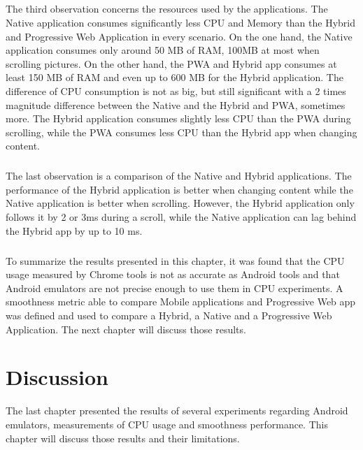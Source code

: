 \documentclass{kththesis}
\begin{document}
\paragraph{}
The third observation concerns the resources used by the applications. The Native application consumes significantly less CPU and Memory than the Hybrid and Progressive Web Application in every scenario. On the one hand, the Native application consumes only around 50 MB of RAM, 100MB at most when scrolling pictures. On the other hand, the PWA and Hybrid app consumes at least 150 MB of RAM and even up to 600 MB for the Hybrid application.  \newline
The difference of CPU consumption is not as big, but still significant with a 2 times magnitude difference between the Native and the Hybrid and PWA, sometimes more. The Hybrid application consumes slightly less CPU than the PWA during scrolling, while the PWA consumes less CPU than the Hybrid app when changing content. 

\paragraph{}
The last observation is a comparison of the Native and Hybrid applications. The performance of the Hybrid application is better when changing content while the Native application is better when scrolling. However, the Hybrid application only follows it by 2 or 3ms during a scroll, while the Native application can lag behind the Hybrid app by up to 10 ms. 

\paragraph{}
To summarize the results presented in this chapter, it was found that the CPU usage measured by Chrome tools is not as accurate as Android tools and that Android emulators are not precise enough to use them in CPU experiments. A smoothness metric able to compare Mobile applications and Progressive Web app was defined and used to compare a Hybrid, a Native and a Progressive Web Application. The next chapter will discuss those results.


\chapter{Discussion}

The last chapter presented the results of several experiments regarding Android emulators, measurements of CPU usage and smoothness performance. This chapter will discuss those results and their limitations.
\end{document}
